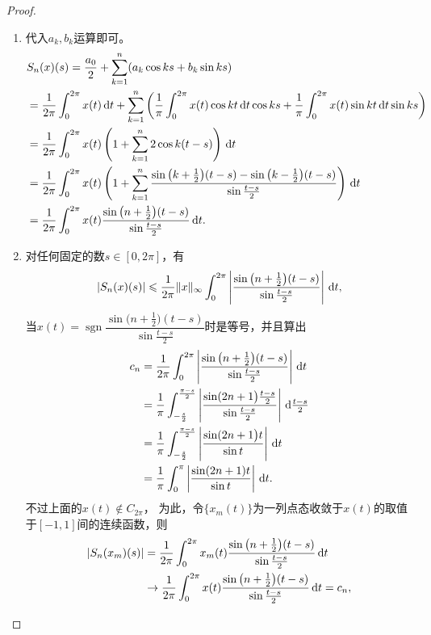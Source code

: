 \begin{proof}
    \begin{enumerate}[label=(\roman*)]
    \item 代入$a_k,b_k$运算即可。
    \begin{align*}
    &S_n(x)(s)=\frac{a_0}{2}+\sum_{k=1}^n(a_k\cos ks+b_k\sin ks)\\
    &=\frac{1}{2\pi}\int_0^{2\pi}x(t)\,{\rm d}t
    +\sum_{k=1}^n\left(\frac{1}{\pi}\int_0^{2\pi}x(t)\cos kt\,{\rm d}t\cos ks
    +\frac{1}{\pi}\int_0^{2\pi}x(t)\sin kt\,{\rm d}t\sin ks\right)\\
    &=\frac{1}{2\pi}\int_0^{2\pi}x(t)\left(1+\sum_{k=1}^n2\cos k(t-s)\right)\,{\rm d}t\\
    &=\frac{1}{2\pi}\int_0^{2\pi}x(t)\left(1+\sum_{k=1}^n
    \frac{\sin\big(k+\frac{1}{2}\big)(t-s)-\sin\big(k-\frac{1}{2}\big)(t-s)}{\sin\frac{t-s}{2}}\right)\,{\rm d}t\\
    &=\frac{1}{2\pi}\int_0^{2\pi}x(t)
    \frac{\sin\big(n+\frac{1}{2}\big)(t-s)}{\sin\frac{t-s}{2}}\,{\rm d}t.
    \end{align*}
    \item 对任何固定的数$s\in[0,2\pi]$，有
    \[|S_n(x)(s)|\leqslant\frac{1}{2\pi}\|x\|_\infty
    \int_0^{2\pi}\left|\frac{\sin\big(n+\frac{1}{2}\big)(t-s)}{\sin\frac{t-s}{2}}\right|\,{\rm d}t,\]
    当$x(t)=\operatorname{sgn}
    \dfrac{\sin\big(n+\frac{1}{2}\big)(t-s)}{\sin\frac{t-s}{2}}$时是等号，并且算出
    \begin{align*}
    c_n&=\frac{1}{2\pi}\int_0^{2\pi}\left|\frac{\sin\big(n+\frac{1}{2}\big)(t-s)}{\sin\frac{t-s}{2}}\right|\,{\rm d}t\\
    &=\frac{1}{\pi}\int_{-\frac{s}{2}}^\frac{\pi-s}{2}\left|\frac{\sin(2n+1\big)\frac{t-s}{2}}{\sin\frac{t-s}{2}}\right|\,{\rm d}\tfrac{t-s}{2}\\
    &=\frac{1}{\pi}\int_{-\frac{s}{2}}^\frac{\pi-s}{2}\left|\frac{\sin(2n+1\big)t}{\sin t}\right|\,{\rm d}t\\
    &=\frac{1}{\pi}\int_0^{\pi}\left|\frac{\sin(2n+1)t}{\sin t}\right|\,{\rm d}t.
    \end{align*}
    不过上面的$x(t) \notin C_{2\pi}$，
    为此，令$\{x_m(t)\}$为一列点态收敛于$x(t)$的取值于$[-1,1]$间的连续函数，则
    \begin{align*}
    |S_n(x_m)(s)|&=\frac{1}{2\pi}\int_0^{2\pi}x_m(t)
    \frac{\sin\big(n+\frac{1}{2}\big)(t-s)}{\sin\frac{t-s}{2}}\,{\rm d}t\\
    &\to\frac{1}{2\pi}\int_0^{2\pi}x(t)
    \frac{\sin\big(n+\frac{1}{2}\big)(t-s)}{\sin\frac{t-s}{2}}\,{\rm d}t=c_n,

\end{align*}
\end{enumerate}
\end{proof}
